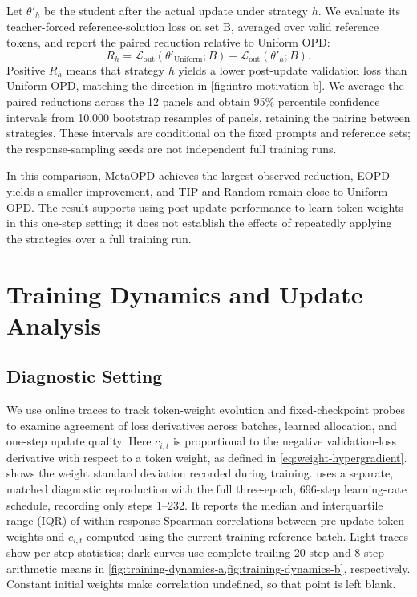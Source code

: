 \documentclass{article}
\theoremstyle{plain}
\theoremstyle{definition}
\theoremstyle{remark}
\begin{document}
Let \(\theta'_h\) be the student after the actual update under strategy \(h\). We evaluate its teacher-forced reference-solution loss on set B, averaged over valid reference tokens, and report the paired reduction relative to Uniform OPD:
\begin{equation}
    R_h
    =\mathcal L_{\mathrm{out}}(\theta'_{\mathrm{Uniform}};B)
     -\mathcal L_{\mathrm{out}}(\theta'_h;B).
\label{eq:intro-loss-reduction}
\end{equation}
Positive \(R_h\) means that strategy \(h\) yields a lower post-update validation loss than Uniform OPD, matching the direction in \cref{fig:intro-motivation-b}. We average the paired reductions across the 12 panels and obtain 95\% percentile confidence intervals from 10,000 bootstrap resamples of panels, retaining the pairing between strategies. These intervals are conditional on the fixed prompts and reference sets; the response-sampling seeds are not independent full training runs.

In this comparison, MetaOPD achieves the largest observed reduction, EOPD yields a smaller improvement, and TIP and Random remain close to Uniform OPD. The result supports using post-update performance to learn token weights in this one-step setting; it does not establish the effects of repeatedly applying the strategies over a full training run.

\section{Training Dynamics and Update Analysis}
\label{app:checkpoint-credit-diagnostic}

\subsection{Diagnostic Setting}

We use online traces to track token-weight evolution and fixed-checkpoint probes to examine agreement of loss derivatives across batches, learned allocation, and one-step update quality. Here \(c_{i,t}\) is proportional to the negative validation-loss derivative with respect to a token weight, as defined in \cref{eq:weight-hypergradient}.  shows the weight standard deviation recorded during training.  uses a separate, matched diagnostic reproduction with the full three-epoch, 696-step learning-rate schedule, recording only steps 1--232. It reports the median and interquartile range (IQR) of within-response Spearman correlations between pre-update token weights and \(c_{i,t}\) computed using the current training reference batch. Light traces show per-step statistics; dark curves use complete trailing 20-step and 8-step arithmetic means in \cref{fig:training-dynamics-a,fig:training-dynamics-b}, respectively. Constant initial weights make correlation undefined, so that point is left blank.
\end{document}
